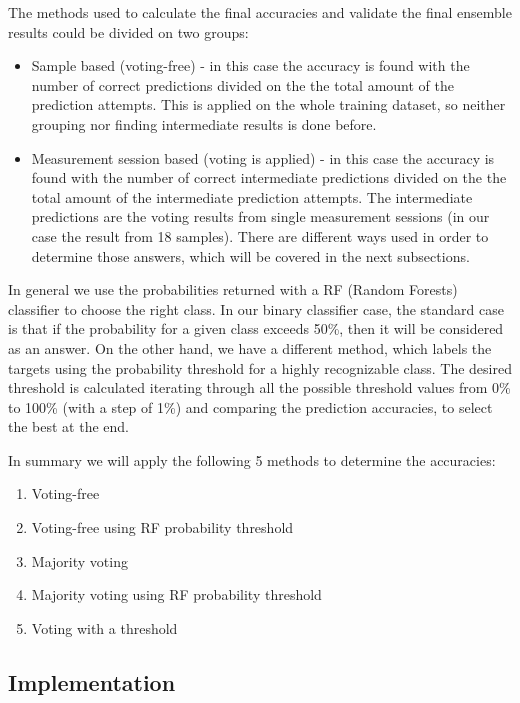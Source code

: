 \documentclass[12pt]{article}
\begin{document}
The methods used to calculate the final accuracies and validate the final ensemble results could be divided on two groups:
\begin{itemize}
\item Sample based (voting-free) - in this case the accuracy is found with the number of correct predictions divided on the the total amount of the prediction attempts. This is applied on the whole training dataset, so neither grouping nor finding intermediate results is done before.
\item Measurement session based (voting is applied) - in this case the accuracy is found with the number of correct intermediate predictions divided on the the total amount of the intermediate prediction attempts. The intermediate predictions are the voting results from single measurement sessions (in our case the result from 18 samples). There are different ways used in order to determine those answers, which will be covered in the next subsections.
\end{itemize}

In general we use the probabilities returned with a RF (Random Forests) classifier to choose the right class. In our binary classifier case, the standard case is that if the probability for a given class exceeds 50\%, then it will be considered as an answer. On the other hand, we have a different method, which labels the targets using the probability threshold for a highly recognizable class. The desired threshold is calculated iterating through all the possible threshold values from 0\% to 100\% (with a step of 1\%) and comparing the prediction accuracies, to select the best at the end.

In summary we will apply the following 5 methods to determine the accuracies:

\begin{enumerate}
	\item Voting-free
	\item Voting-free using RF probability threshold
	\item Majority voting
	\item Majority voting using RF probability threshold
	\item Voting with a threshold
\end{enumerate}


\subsection{Implementation}
\end{document}
